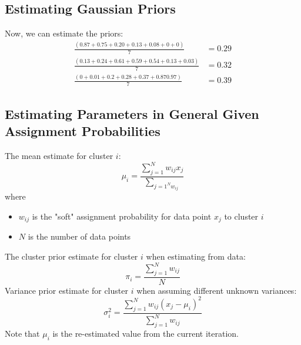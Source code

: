 \documentclass[10pt]{article}
\begin{document}
\subsection*{Estimating Gaussian Priors}
Now, we can estimate the priors:
\begin{align*}
    \frac{(0.87 + 0.75 + 0.20 + 0.13 + 0.08 + 0 + 0)}{7} &= 0.29\\
    \frac{(0.13 + 0.24 + 0.61 + 0.59 + 0.54 + 0.13 + 0.03)}{7} &= 0.32\\
    \frac{(0 + 0.01 + 0.2 + 0.28 + 0.37 + 0.87 0.97)}{7} &= 0.39
\end{align*}

\subsection*{Estimating Parameters in General Given Assignment Probabilities}
The mean estimate for cluster $i$:
\[\mu_i = \frac{\sum_{j = 1}^N w_{ij} x_j}{\sum_{j = 1^N w_{ij}}}\]
where 
\begin{itemize}
    \item $w_{ij}$ is the "soft" assignment probability for data point $x_j$ to cluster $i$
    \item $N$ is the number of data points
\end{itemize}
The cluster prior estimate for cluster $i$ when estimating from data:
\[\pi_i = \frac{\sum_{j = 1}^N w_{ij}}{N}\]
Variance prior estimate for cluster $i$ when assuming different unknown variances:
\[\sigma_i^2 = \frac{\sum_{j = 1}^N w_{ij} (x_j - \mu_i)^2}{\sum_{j = 1}^N w_{ij}}\]
Note that $\mu_i$ is the re-estimated value from the current iteration.
\end{document}
